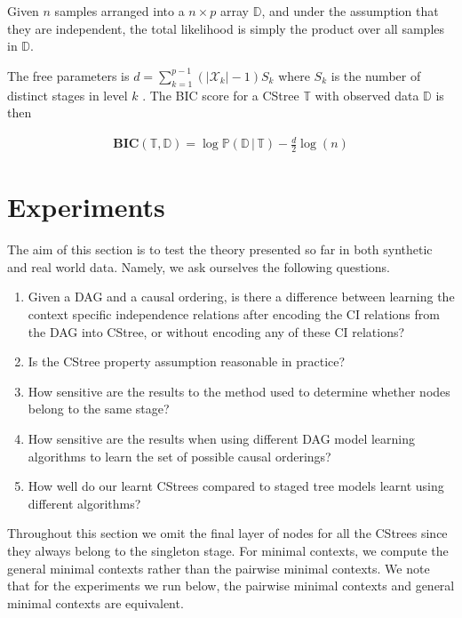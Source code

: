 \documentclass{tufte-book}
\begin{document}
Given \(n\) samples arranged into a \(n \times p\) array \(\mathbb{D}\), and under the assumption that they are independent, the total likelihood is simply the product over all samples in \(\mathbb{D}\).


The free parameters is \(d=\sum_{k=1}^{p-1} (|\mathcal{X}_k| - 1)S_k\) where \(S_k\) is the number of distinct stages in level \(k\) \cite{duarte-2021-repres-contex}. The  BIC score for a CStree \(\mathbb{T}\) with observed data \(\mathbb{D}\) is then

\begin{align*}
\textbf{BIC}(\mathbb{T},\mathbb{D}) = \log\mathbb{P}(\mathbb{D}\,|\,\mathbb{T}) - \frac{d}{2}\log(n)
\end{align*}



\chapter{Experiments}
\label{sec:orgf664c20}
The aim of this section is to test the theory presented so far in both synthetic and real world data. Namely, we ask ourselves the following questions.

\begin{enumerate}
\item Given a DAG and a causal ordering, is there a difference between learning the context specific independence relations after encoding the CI relations from the DAG into CStree, or without encoding any of these CI relations?
\item Is the CStree property assumption reasonable in practice?
\item How sensitive are the results to the method used to determine whether nodes belong to the same stage?
\item How sensitive are the results when using different DAG model learning algorithms to learn the set of possible causal orderings?
\item How well do our learnt CStrees compared to staged tree models learnt using different algorithms?
\end{enumerate}


Throughout this section we omit the final layer of nodes for all the CStrees since they always belong to the singleton stage. For minimal contexts, we compute the general minimal contexts rather than the pairwise minimal contexts. We note that for the experiments we run below, the pairwise minimal contexts and general minimal contexts are equivalent.
\end{document}
